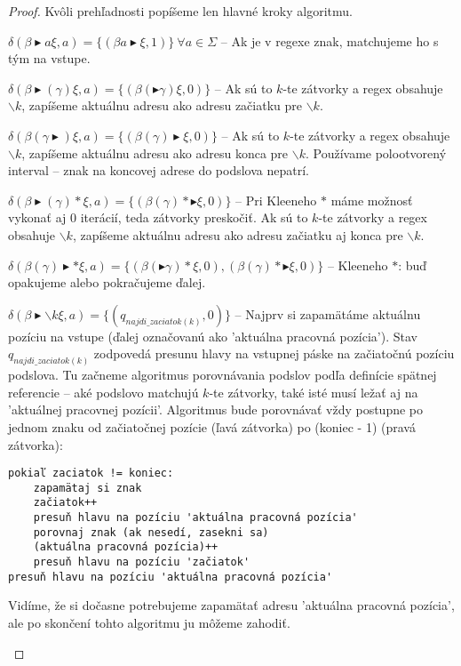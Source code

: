 \begin{proof}
Kvôli prehľadnosti popíšeme len hlavné kroky algoritmu. 
\begin{list}{}{}
\item $\delta(\beta\blacktriangleright a \xi, a) = \lbrace (\beta a \blacktriangleright \xi, 1) \rbrace ~ \forall a \in \Sigma$ -- Ak je v regexe znak, matchujeme ho s tým na vstupe.
\item $\delta(\beta\blacktriangleright(\gamma)\xi, a) = \lbrace (\beta(\blacktriangleright\gamma)\xi, 0) \rbrace$ -- Ak sú to $k$-te zátvorky a regex obsahuje $\backslash k$, zapíšeme aktuálnu adresu ako adresu začiatku pre $\backslash k$.
\item $\delta(\beta(\gamma\blacktriangleright)\xi, a) = \lbrace (\beta(\gamma)\blacktriangleright\xi, 0) \rbrace$ -- Ak sú to $k$-te zátvorky a regex obsahuje $\backslash k$, zapíšeme aktuálnu adresu ako adresu konca pre $\backslash k$. Používame polootvorený interval -- znak na koncovej adrese do podslova nepatrí.
\item $\delta(\beta\blacktriangleright(\gamma)*\xi, a) = \lbrace (\beta(\gamma)*\blacktriangleright\xi, 0) \rbrace$ -- Pri Kleeneho $*$ máme možnosť vykonať aj 0 iterácií, teda zátvorky preskočiť. Ak sú to $k$-te zátvorky a regex obsahuje $\backslash k$, zapíšeme aktuálnu adresu ako adresu začiatku aj konca pre $\backslash k$.
\item $\delta(\beta(\gamma)\blacktriangleright * \xi, a) = \lbrace (\beta(\blacktriangleright\gamma)*\xi, 0),(\beta(\gamma)*\blacktriangleright\xi, 0) \rbrace$ -- Kleeneho $*$: buď opakujeme alebo pokračujeme ďalej.
\item $\delta(\beta\blacktriangleright\backslash k \xi, a) = \lbrace (q_{najdi\_zaciatok(k)}, 0) \rbrace$ -- Najprv si zapamätáme aktuálnu pozíciu na vstupe (ďalej označovanú ako 'aktuálna pracovná pozícia'). Stav $q_{najdi\_zaciatok(k)}$ zodpovedá presunu hlavy na vstupnej páske na začiatočnú pozíciu podslova. Tu začneme algoritmus porovnávania podslov podľa definície spätnej referencie -- aké podslovo matchujú $k$-te zátvorky, také isté musí ležať aj na 'aktuálnej pracovnej pozícii'. Algoritmus bude porovnávať vždy postupne po jednom znaku od začiatočnej pozície (ľavá zátvorka) po (koniec - 1) (pravá zátvorka):

\begin{verbatim}
pokiaľ zaciatok != koniec: 
    zapamätaj si znak 
    začiatok++ 
    presuň hlavu na pozíciu 'aktuálna pracovná pozícia' 
    porovnaj znak (ak nesedí, zasekni sa) 
    (aktuálna pracovná pozícia)++ 
    presuň hlavu na pozíciu 'začiatok' 
presuň hlavu na pozíciu 'aktuálna pracovná pozícia'
\end{verbatim}
Vidíme, že si dočasne potrebujeme zapamätať adresu 'aktuálna pracovná pozícia', ale po skončení tohto algoritmu ju môžeme zahodiť.


\end{list}
\end{proof}
